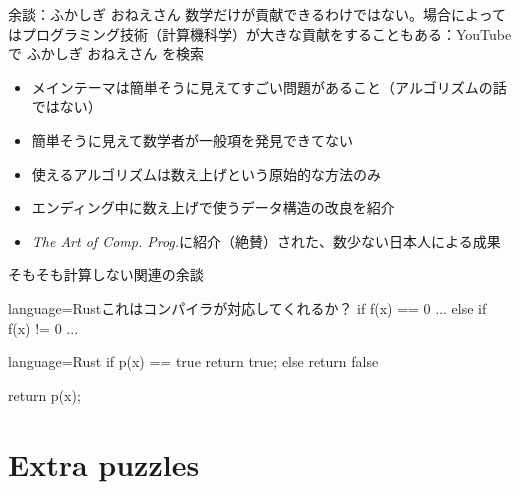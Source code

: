 \documentclass{beamer}
\begin{document}
\begin{frame}[fragile]{余談：ふかしぎ おねえさん}{}
数学だけが貢献できるわけではない。場合によってはプログラミング技術（計算機科学）が大きな貢献をすることもある：YouTubeで ふかしぎ おねえさん を検索

\vfill
\begin{itemize}%
\item メインテーマは簡単そうに見えてすごい問題があること（アルゴリズムの話ではない）
\item 簡単そうに見えて数学者が一般項を発見できてない
\item 使えるアルゴリズムは数え上げという原始的な方法のみ
\item エンディング中に数え上げで使うデータ構造の改良を紹介
\item \textit{The Art of Comp. Prog.}に紹介（絶賛）された、数少ない日本人による成果
\end{itemize}
\end{frame}

\begin{frame}[fragile]{そもそも計算しない関連の余談}{}

\begin{codeof}{language=Rust}{これはコンパイラが対応してくれるか？}
if f(x) == 0 {
  ...
}
else if f(x) != 0 {
  ...
}
\end{codeof}

\begin{codeof}{language=Rust}{}
if p(x) == true {
  return true;
}
else {
  return false
}
\end{codeof}

return p(x);
\end{frame}

\section{Extra puzzles}		%
\subsection{}
\end{document}
